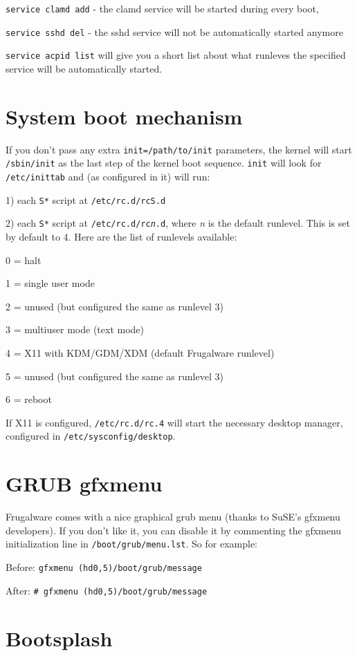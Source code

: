 {\tt service clamd add} - the clamd service will be started during every boot,

{\tt service sshd del} - the sshd service will not be automatically started anymore

{\tt service acpid list} will give you a short list about what runleves the specified service will be automatically started.

\section{System boot mechanism}

If you don't pass any extra {\tt init=/path/to/init} parameters, the kernel will start {\tt /sbin/init} as the last step of the kernel boot sequence. {\tt init} will look for {\tt /etc/inittab} and (as configured in it) will run:

1) each {\tt S*} script at {\tt /etc/rc.d/rcS.d}

2) each {\tt S*} script at {\tt /etc/rc.d/rc\textit{n}.d}, where \textit{n} is the default runlevel. This is set by default to 4. Here are the list of runlevels available:

0 = halt

1 = single user mode

2 = unused (but configured the same as runlevel 3)

3 = multiuser mode (text mode)

4 = X11 with KDM/GDM/XDM (default Frugalware runlevel)

5 = unused (but configured the same as runlevel 3)

6 = reboot

If X11 is configured, {\tt /etc/rc.d/rc.4} will start the necessary desktop manager, configured in {\tt /etc/sysconfig/desktop}.

\section{GRUB gfxmenu}

Frugalware comes with a nice graphical grub menu (thanks to SuSE's gfxmenu developers). If you don't like it, you can disable it by commenting the gfxmenu initialization line in {\tt /boot/grub/menu.lst}. So for example:

Before:
{\tt gfxmenu (hd0,5)/boot/grub/message}

After:
{\tt # gfxmenu (hd0,5)/boot/grub/message}

\section{Bootsplash}

